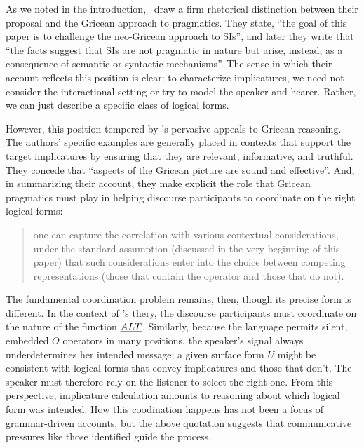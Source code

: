 \documentclass{article}
\begin{document}
As we noted in the introduction, \CFS\ draw a firm rhetorical
distinction between their proposal and the Gricean approach to
pragmatics. They state, ``the goal of this paper is to challenge the
neo-Gricean approach to SIs'', and later they write that ``the facts
suggest that SIs are not pragmatic in nature but arise, instead, as a
consequence of semantic or syntactic mechanisms''. The sense in which
their account reflects this position is clear: to characterize
implicatures, we need not consider the interactional setting or try to
model the speaker and hearer. Rather, we can just describe a specific
class of logical forms.

However, this position tempered by \CFS's pervasive appeals to Gricean
reasoning.  The authors' specific examples are generally placed in
contexts that support the target implicatures by ensuring that they
are relevant, informative, and truthful.  They concede that ``aspects
of the Gricean picture are sound and effective''. And, in summarizing
their account, they make explicit the role that Gricean pragmatics
must play in helping discourse participants to coordinate on the right
logical forms:
%
\begin{quote}
  one can capture the correlation with various contextual
  considerations, under the standard assumption (discussed in the very
  beginning of this paper) that such considerations enter into the
  choice between competing representations (those that contain the
  operator and those that do not).
\end{quote}

The fundamental coordination problem remains, then, though its precise
form is different. In the context of \CFS's thery, the discourse
participants must coordinate on the nature of the function $\emph{ALT}$.
Similarly, because the language permits silent, embedded $O$ operators
in many positions, the speaker's signal always underdetermines her
intended message; a given surface form $U$ might be consistent with
logical forms that convey implicatures and those that don't. The
speaker must therefore rely on the listener to select the right one.
From this perspective, implicature calculation amounts to reasoning
about which logical form was intended. How this coodination happens
has not been a focus of grammar-driven accounts, but the above
quotation suggests that communicative pressures like those
\citet{Grice75} identified guide the process.
\end{document}
